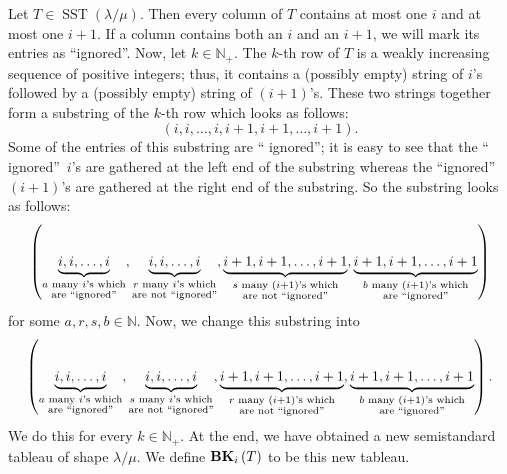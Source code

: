 \documentclass[12pt]{article}
\theoremstyle{plain}
\theoremstyle{definition}
\begin{document}
Let $T\in\operatorname*{SST}\left(  \lambda/\mu\right)  $. Then every column of $T$ contains at most one $i$ and
at most one $i+1$. If a column contains both an
$i$ and an $i+1$, we will mark its entries as
\textquotedblleft ignored\textquotedblright. Now, let $k\in\mathbb{N}_{+}$.
The $k$-th row of $T$ is a weakly increasing sequence of positive integers;
thus, it contains a (possibly empty) string of $i$'s followed by a (possibly
empty) string of $\left(  i+1\right)  $'s. These two strings together form a
substring of the $k$-th row which looks as follows:%
\[
\left(  i,i,\ldots,i,i+1,i+1,\ldots,i+1\right).
\]
Some of the entries of this substring are \textquotedblleft
ignored\textquotedblright; it is easy to see that the \textquotedblleft
ignored\textquotedblright\ $i$'s are gathered at the left end of the substring
whereas the \textquotedblleft ignored\textquotedblright\ $\left(  i+1\right)
$'s are gathered at the right end of the substring. So the substring looks
as follows:
\[
\left(  \underbrace{i,i,\ldots,i}_{\substack{a\text{ many }i\text{'s
which}\\\text{are \textquotedblleft ignored\textquotedblright}}%
},\underbrace{i,i,\ldots,i}_{\substack{r\text{ many }i\text{'s which}%
\\\text{are not \textquotedblleft ignored\textquotedblright}}%
},\underbrace{i+1,i+1,\ldots,i+1}_{\substack{s\text{ many }\left(  i+1\right)
\text{'s which}\\\text{are not \textquotedblleft ignored\textquotedblright}%
}},\underbrace{i+1,i+1,\ldots,i+1}_{\substack{b\text{ many }\left(
i+1\right)  \text{'s which}\\\text{are \textquotedblleft
ignored\textquotedblright}}}\right)
\]
for some $a,r,s,b\in\mathbb{N}$. Now, we change this substring into%
\[
\left(  \underbrace{i,i,\ldots,i}_{\substack{a\text{ many }i\text{'s
which}\\\text{are \textquotedblleft ignored\textquotedblright}}%
},\underbrace{i,i,\ldots,i}_{\substack{s\text{ many }i\text{'s which}%
\\\text{are not \textquotedblleft ignored\textquotedblright}}%
},\underbrace{i+1,i+1,\ldots,i+1}_{\substack{r\text{ many }\left(  i+1\right)
\text{'s which}\\\text{are not \textquotedblleft ignored\textquotedblright}%
}},\underbrace{i+1,i+1,\ldots,i+1}_{\substack{b\text{ many }\left(
i+1\right)  \text{'s which}\\\text{are \textquotedblleft
ignored\textquotedblright}}}\right)  .
\]
We do this for every $k\in\mathbb{N}_{+}$. At the end, we have obtained a new semistandard
tableau of shape $\lambda/\mu$. We define ${\mathbf{BK}}_{i}\left(
T\right)  $ to be this new tableau.
\end{document}
